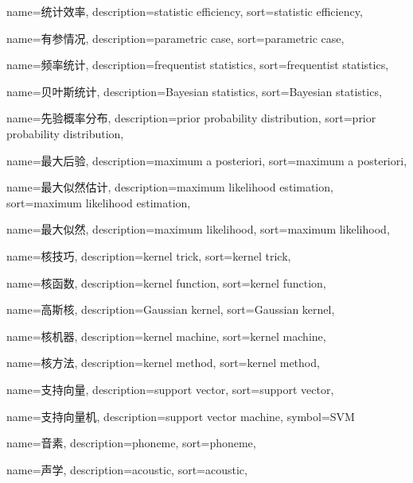 {
  name=统计效率,
  description={statistic efficiency},
  sort={statistic efficiency},
}

{
  name=有参情况,
  description={parametric case},
  sort={parametric case},
}

{
  name=频率统计,
  description={frequentist statistics},
  sort={frequentist statistics},
}

{
  name=贝叶斯统计,
  description={Bayesian statistics},
  sort={Bayesian statistics},
}

{
  name=先验概率分布,
  description={prior probability distribution},
  sort={prior probability distribution},
}

{
  name=最大后验,
  description={maximum a posteriori},
  sort={maximum a posteriori},
}

{
  name=最大似然估计,
  description={maximum likelihood estimation},
  sort={maximum likelihood estimation},
}

{
  name=最大似然,
  description={maximum likelihood},
  sort={maximum likelihood},
}

{
  name=核技巧,
  description={kernel trick},
  sort={kernel trick},
}

{
  name=核函数,
  description={kernel function},
  sort={kernel function},
}

{
  name=高斯核,
  description={Gaussian kernel},
  sort={Gaussian kernel},
}

{
  name=核机器,
  description={kernel machine},
  sort={kernel machine},
}

{
  name=核方法,
  description={kernel method},
  sort={kernel method},
}

{
  name=支持向量,
  description={support vector},
  sort={support vector},
}

{
  name=支持向量机,
  description={support vector machine},
  symbol={SVM}
}

{
  name=音素,
  description={phoneme},
  sort={phoneme},
}

{
  name=声学,
  description={acoustic},
  sort={acoustic},
}

